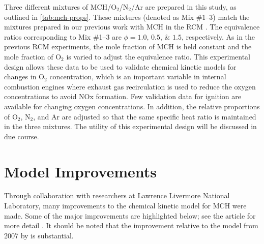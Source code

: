 \documentclass[../main.tex]{subfiles}
\begin{document}
Three different mixtures of MCH/O$_2$/N$_2$/Ar are prepared in this study, as
outlined in \cref{tab:mch-props}. These mixtures (denoted as Mix \#1--3) match the mixtures
prepared in our previous work with MCH in the RCM \cite{Mittal2009}. The equivalence ratios
corresponding to Mix \#1--3 are $\phi=\numlist{1.0;0.5;1.5}$, respectively.
As in the previous RCM experiments, the mole fraction of MCH is held constant
and the mole fraction of O$_2$ is varied to adjust the equivalence ratio. This
experimental design allows these data to be used to validate chemical kinetic
models for changes in O$_2$ concentration, which is an important variable in
internal combustion engines where exhaust gas recirculation is used to reduce
the oxygen concentrations to avoid NOx formation. Few validation data for
ignition are available for changing oxygen concentrations. In addition, the
relative proportions of O$_2$, N$_2$, and Ar are adjusted so that the same specific
heat ratio is maintained in the three mixtures. The utility of this
experimental design will be discussed in due course.

\section{Model Improvements}
\label{sec:mch-model-improvements}

Through collaboration with researchers at Lawrence Livermore National
Laboratory, many improvements to the chemical kinetic model for MCH were
made. Some of the major improvements are highlighted below; see the article
for more detail \cite{Weber2014}. It should be noted that the improvement relative to the model
from 2007 by \textcite{Pitz2007} is substantial.
\end{document}
